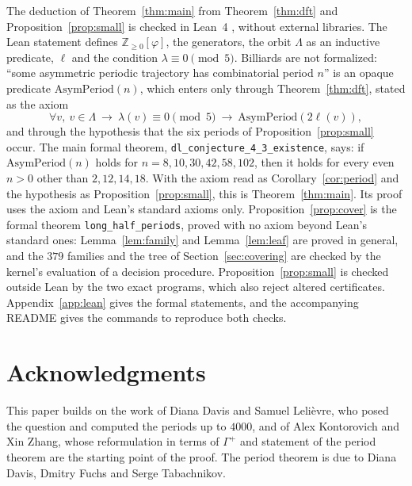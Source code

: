\documentclass[11pt]{article}
\theoremstyle{definition}
\theoremstyle{remark}
\newcommand{\Gp}{\Gamma^{+}}
\begin{document}
The deduction of Theorem~\ref{thm:main} from Theorem~\ref{thm:dft} and
Proposition~\ref{prop:small} is checked in Lean~4 \cite{Lean}, without
external libraries. The Lean statement defines $\mathbb{Z}_{\ge0}[\varphi]$,
the generators, the orbit $\Lambda$ as an inductive predicate, $\ell$ and
the condition $\lambda\equiv0\pmod5$. Billiards are not formalized:
``some asymmetric periodic trajectory has combinatorial period $n$'' is an
opaque predicate $\mathrm{AsymPeriod}(n)$, which enters only through
Theorem~\ref{thm:dft}, stated as the axiom
\[
\forall v,\ v\in\Lambda\ \to\ \lambda(v)\equiv0\pmod5\ \to\
\mathrm{AsymPeriod}(2\ell(v)),
\]
and through the hypothesis that the six periods of
Proposition~\ref{prop:small} occur. The main formal theorem,
\texttt{dl\_conjecture\_4\_3\_existence}, says: if
$\mathrm{AsymPeriod}(n)$ holds for $n=8,10,30,42,58,102$, then it holds for
every even $n>0$ other than $2,12,14,18$. With the axiom read as
Corollary~\ref{cor:period} and the hypothesis as
Proposition~\ref{prop:small}, this is Theorem~\ref{thm:main}. Its proof
uses the axiom and Lean's standard axioms only.
Proposition~\ref{prop:cover} is the formal theorem
\texttt{long\_half\_periods}, proved with no axiom beyond Lean's standard
ones: Lemma~\ref{lem:family} and
Lemma~\ref{lem:leaf} are proved in general, and the $379$ families and the
tree of Section~\ref{sec:covering} are checked by the kernel's evaluation
of a decision procedure. Proposition~\ref{prop:small} is checked outside
Lean by the two exact programs, which also reject altered certificates.
Appendix~\ref{app:lean} gives the formal statements, and the accompanying
README gives the commands to reproduce both checks.

\section*{Acknowledgments}
This paper builds on the work of Diana Davis and Samuel Lelièvre, who
posed the question and computed the periods up to $4000$, and of Alex
Kontorovich and Xin Zhang, whose reformulation in terms of $\Gp$ and
statement of the period theorem are the starting point of the proof. The
period theorem is due to Diana Davis, Dmitry Fuchs and Serge Tabachnikov.
\end{document}
